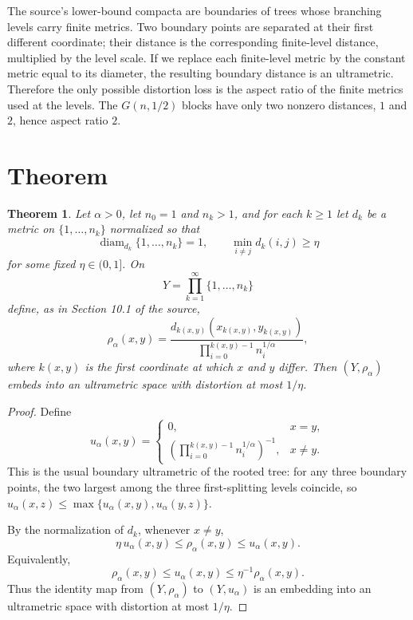 \documentclass[11pt]{article}
\newtheorem*{theorem*}{Theorem}
\newcommand{\diam}{\operatorname{diam}}
\begin{document}
The source's lower-bound compacta are boundaries of trees whose branching
levels carry finite metrics. Two boundary points are separated at their first
different coordinate; their distance is the corresponding finite-level
distance, multiplied by the level scale. If we replace each finite-level metric
by the constant metric equal to its diameter, the resulting boundary distance
is an ultrametric. Therefore the only possible distortion loss is the aspect
ratio of the finite metrics used at the levels. The \(G(n,1/2)\) blocks have
only two nonzero distances, \(1\) and \(2\), hence aspect ratio \(2\).

\section*{Theorem}

\begin{theorem*}
Let \(\alpha>0\), let \(n_0=1\) and \(n_k>1\), and for each \(k\ge 1\) let
\(d_k\) be a metric on \(\{1,\ldots,n_k\}\) normalized so that
\[
\diam_{d_k}\{1,\ldots,n_k\}=1,
\qquad
\min_{i\ne j} d_k(i,j)\ge \eta
\]
for some fixed \(\eta\in(0,1]\). On
\[
Y=\prod_{k=1}^\infty \{1,\ldots,n_k\}
\]
define, as in Section 10.1 of the source,
\[
\rho_\alpha(x,y)
=
\frac{d_{k(x,y)}(x_{k(x,y)},y_{k(x,y)})}
{\prod_{i=0}^{k(x,y)-1} n_i^{1/\alpha}},
\]
where \(k(x,y)\) is the first coordinate at which \(x\) and \(y\) differ.
Then \((Y,\rho_\alpha)\) embeds into an ultrametric space with distortion at
most \(1/\eta\).
\end{theorem*}

\begin{proof}
Define
\[
u_\alpha(x,y)=
\begin{cases}
0, & x=y,\\[0.3em]
\left(\prod_{i=0}^{k(x,y)-1} n_i^{1/\alpha}\right)^{-1},& x\ne y.
\end{cases}
\]
This is the usual boundary ultrametric of the rooted tree:
for any three boundary points, the two largest among the three first-splitting
levels coincide, so \(u_\alpha(x,z)\le
\max\{u_\alpha(x,y),u_\alpha(y,z)\}\).

By the normalization of \(d_k\), whenever \(x\ne y\),
\[
\eta\,u_\alpha(x,y)
\le
\rho_\alpha(x,y)
\le
u_\alpha(x,y).
\]
Equivalently,
\[
\rho_\alpha(x,y)\le u_\alpha(x,y)\le \eta^{-1}\rho_\alpha(x,y).
\]
Thus the identity map from \((Y,\rho_\alpha)\) to \((Y,u_\alpha)\) is an
embedding into an ultrametric space with distortion at most \(1/\eta\).
\end{proof}
\end{document}
